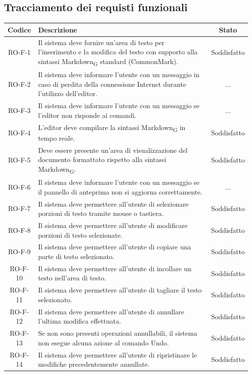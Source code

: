 \documentclass[11pt,a4paper]{article}
\newcommand{\gls}[1]{#1\textsubscript{G}}
\begin{document}
\subsection{Tracciamento dei requisti funzionali}
\begin{longtable}{|c|p{11cm}|c|}
\hline
\textbf{Codice} & \textbf{Descrizione} & \textbf{Stato}\\
\hline
\endhead
RO-F-1 & Il sistema deve fornire un’area di testo per l’inserimento e la modifica del testo con supporto alla sintassi \gls{Markdown} standard (CommonMark).& Soddisfatto\\
\hline
RO-F-2 & Il sistema deve informare l’utente con un messaggio in caso di perdita della connessione Internet durante l’utilizzo dell’editor. & ...\\
\hline
RO-F-3 & Il sistema deve informare l’utente con un messaggio se l’editor non risponde ai comandi.& ...\\
\hline
RO-F-4 & L'editor deve compilare la sintassi \gls{Markdown} in tempo reale. & Soddisfatto\\
\hline
RO-F-5 & Deve essere presente un'area di visualizzazione del documento formattato rispetto alla sintassi \gls{Markdown}. & Soddisfatto \\
\hline
RO-F-6 & Il sistema deve informare l'utente con un messaggio se il pannello di anteprima non si aggiorna correttamente. & ... \\
\hline
RO-F-7 & Il sistema deve permettere all'utente di selezionare porzioni di testo tramite mouse o tastiera. & Soddisfatto \\
\hline
RO-F-8 & Il sistema deve permettere all'utente di modificare porzioni di testo selezionate. & Soddisfatto \\
\hline
RO-F-9 & Il sistema deve permettere all'utente di copiare una parte di testo selezionato. & Soddisfatto \\
\hline
RO-F-10 & Il sistema deve permettere all'utente di incollare un testo nell'area di testo. & Soddisfatto \\
\hline
RO-F-11 & Il sistema deve permettere all'utente di tagliare il testo selezionato. & Soddisfatto \\
\hline
RO-F-12 & Il sistema deve permettere all'utente di annullare l'ultima modifica effettuata. & Soddisfatto \\
\hline
RO-F-13 & Se non sono presenti operazioni annullabili, il sistema non esegue alcuna azione al comando Undo. & Soddisfatto \\
\hline
RO-F-14 & Il sistema deve permettere all'utente di ripristinare le modifiche precedentemente annullate. & Soddisfatto \\

\end{longtable}
\end{document}
